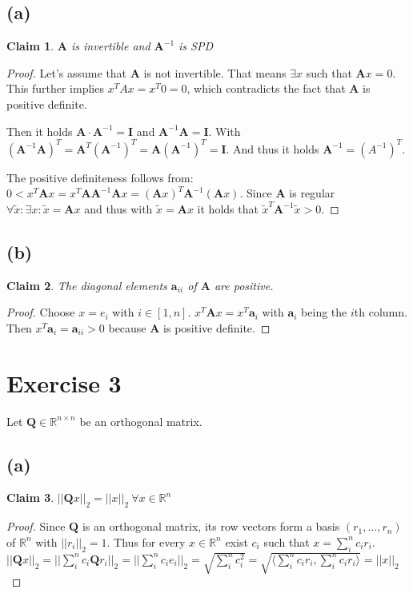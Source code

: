 \documentclass{article}
\newcommand{\norm}[1]{||#1||}
\newtheorem{claim}{Claim}
\begin{document}
	\subsection*{(a)}
		\begin{claim}
			$\pmb A$ is invertible and $\pmb A^{-1}$ is SPD
		\end{claim}
		\begin{proof}
			Let's assume that $\pmb A$ is not invertible. That means $\exists x$ such that $\pmb A x=0$. This further implies $x^{T}Ax = x^{T}0 = 0$, which contradicts the fact that $\pmb A$ is positive definite.
			
			Then it holds $\pmb A\cdot \pmb A^{-1} = \pmb I$ and $\pmb A^{-1}\pmb A =\pmb I$. With $(\pmb A^{-1}\pmb A)^{T} = \pmb A^{T} (\pmb A^{-1})^{T} = \pmb A (\pmb A^{-1})^{T} = \pmb I$. And thus it holds $\pmb A^{-1}=(A^{-1})^{T}$.
			
			The positive definiteness follows from: $0 < x^{T}\pmb Ax = x^{T}\pmb A\pmb A^{-1}\pmb Ax = (\pmb Ax)^{T}\pmb A^{-1}(\pmb Ax)$. Since $\pmb A$ is regular $\forall \tilde{x}: \exists x: \tilde{x} = \pmb A x$ and thus with $\tilde{x} = \pmb A x$ it holds that $\tilde{x}^{T} \pmb A^{-1} \tilde{x} >0$.
		\end{proof}
	\subsection*{(b)}
		\begin{claim}
			The diagonal elements $\pmb a_{ii}$ of $\pmb A$ are positive.
		\end{claim}
		
		\begin{proof}
			Choose $x=e_{i}$ with $i \in [1,n]$. $x^{T}\pmb A x = x^{T}\pmb a_{i}$ with $\pmb a_{i}$ being the $i$th column. Then $x^{T}\pmb a_{i}=\pmb a_{ii} > 0$ because $\pmb A$ is positive definite.
		\end{proof}
		
\section*{Exercise 3}
	Let $\pmb Q\in \mathbb{R}^{n\times n}$ be an orthogonal matrix.
	\subsection*{(a)}
		\begin{claim}
			$\norm{\pmb Qx}_{2} = \norm{x}_{2}\  \forall x \in \mathbb{R}^{n}$
		\end{claim}
		\begin{proof}
			Since $\pmb Q$ is an orthogonal matrix, its row vectors form a basis $(r_{1},\ldots,r_{n})$ of $\mathbb R^{n}$ with $\norm{r_{i}}_{2}=1$. Thus for every $x\in \mathbb{R}^{n}$ exist $c_{i}$ such that $x=\sum_{i}^{n}c_{i}r_{i}$. $\norm{\pmb Q x}_{2}=\norm{\sum_{i}^{n} c_{i} \pmb Q r_{i}}_{2}= \norm{\sum_{i}^{n} c_{i}e_{i}}_{2} = \sqrt{\sum_{i}^{n}c_{i}^{2}} = \sqrt{\langle \sum_{i}^{n} c_{i}r_{i},\sum_{i}^{n}c_{i}r_{i}\rangle} = \norm{x}_{2}$
		\end{proof}
\end{document}
